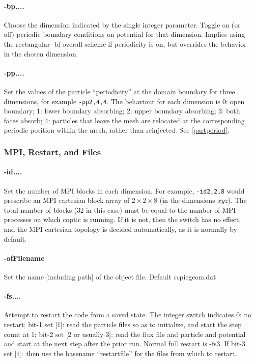 \documentclass[12pt]{article}
\begin{document}
\paragraph{-bp....} Choose the dimension indicated by the single
integer parameter. Toggle on (or off) periodic boundary conditions on
potential for that dimension. Implies using the rectangular -bf
overall scheme if periodicity is on, but overrides the behavior in the
chosen dimension.

\paragraph{-pp....} Set the values of the particle ``periodicity'' at
the domain boundary for three dimensions, for example \verb!-pp2,4,4!.
The behaviour for each dimension is 0: open boundary; 1: lower
boundary absorbing; 2: upper boundary absorbing; 3: both faces absorb;
4: particles that leave the mesh are relocated at the corresponding
periodic position within the mesh, rather than reinjected. See
\ref{partperiod}.

\subsubsection*{MPI, Restart, and Files}

\paragraph{-id....} Set the number of MPI blocks in each
dimension. For example, \verb!-id2,2,8! would prescribe an MPI
cartesian block array of $2\times2\times8$ (in the dimensions $xyz$).
The total number of blocks (32 in this case) must be equal to the
number of MPI processes on which coptic is running. If it is not, then
the switch has no effect, and the MPI cartesian topology is decided
automatically, as it is normally by default.

\paragraph{-ofFilename} Set the name [including path] of the object
file. Default ccpicgeom.dat

\paragraph{-fs....}  Attempt to restart the code from a saved
state. The integer switch indicates 0: no restart; bit-1 set [1]: read
the particle files so as to initialize, and start the step count at 1;
bit-2 set [2 or usually 3]: read the flux file and particle and
potential and start at the next step after the prior run. Normal full
restart is -fs3. If bit-3 set [4]: then use the basename
``restartfile'' for the files from which to restart.
\end{document}
